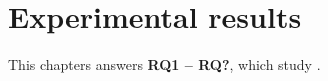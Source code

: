 \chapter{Experimental results}\label{chap:results}

This chapters answers \textbf{RQ1 – RQ?}, which study .
